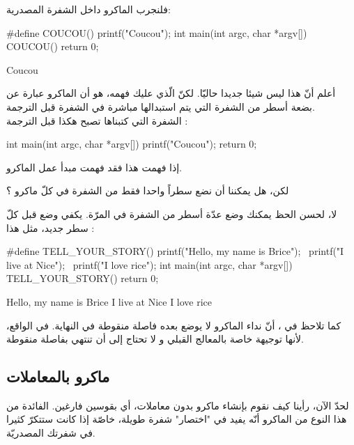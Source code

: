 فلنجرب الماكرو داخل الشفرة المصدرية:
\begin{Csource}
#define COUCOU() printf("Coucou");
int main(int argc, char *argv[])
{
  COUCOU()
  return 0;
}
\end{Csource}
\begin{Console}
Coucou
\end{Console}
أعلم أنّ هذا ليس شيئا جديدا حاليّا. لكنّ الّذي عليك فهمه، هو أن الماكرو عبارة عن بضعة أسطر من الشفرة التي يتم استبدالها مباشرة في الشفرة قبل الترجمة.\\
الشفرة التي كتبناها تصبح هكذا قبل الترجمة :
\begin{Csource}
int main(int argc, char *argv[])
{
	printf("Coucou");
	return 0;
}
\end{Csource}
إذا فهمت هذا فقد فهمت مبدأ عمل الماكرو.
\begin{question}
  لكن، هل يمكننا أن نضع سطراً واحدا فقط من الشفرة في كلّ ماكرو ؟
\end{question}
لا، لحسن الحظ يمكنك وضع عدّة أسطر من الشفرة في المرّة. يكفي وضع
\InlineCode{\textbackslash}
قبل كلّ سطر جديد، مثل هذا :
\begin{Csource}
#define TELL_YOUR_STORY() printf("Hello, my name is Brice\n"); \
                          printf("I live at Nice\n"); \
                          printf("I love rice\n");
int main(int argc, char *argv[])
{
	TELL_YOUR_STORY()
	return 0;
}
\end{Csource}
\begin{Console}
Hello, my name is Brice
I live at Nice
I love rice
\end{Console}
كما تلاحظ في
،
أنّ نداء الماكرو لا يوضع بعده فاصلة منقوطة في النهاية. في الواقع، لأنها توجيهة خاصة بالمعالج القبلي و لا تحتاج إلى  أن تنتهي بفاصلة منقوطة.

\subsection{ماكرو بالمعاملات}
لحدّ الآن، رأينا كيف نقوم بإنشاء ماكرو بدون معاملات، أي بقوسين فارغين. الفائدة من هذا النوع من الماكرو أنّه يفيد في "اختصار" شفرة طويلة، خاصّة إذا كانت ستتكرّ كثيرا في شفرتك المصدريّة.

